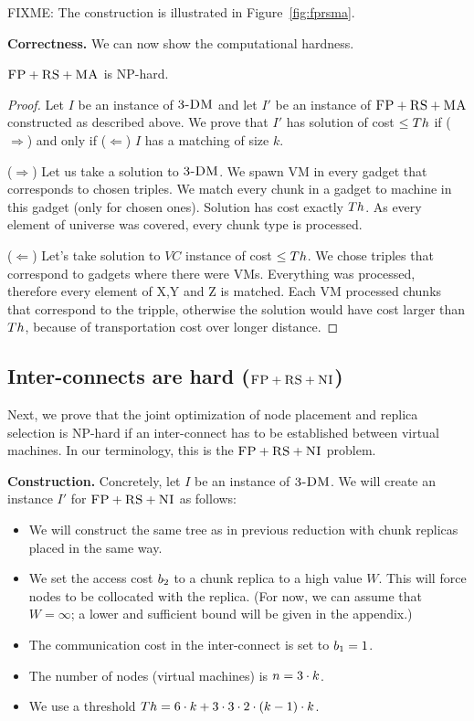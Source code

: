 FIXME: The construction is illustrated in Figure~\ref{fig:fprsma}.

\textbf{Correctness.}
We can now show the computational hardness.
\begin{theorem}
$\textsc{FP}+\textsc{RS}+\textsc{MA}$ is NP-hard.
\end{theorem}
\begin{proof}
Let $I$ be an instance of $\textsc{3-DM}$ and let $I'$ be an instance of
$\textsc{FP}+\textsc{RS}+\textsc{MA}$ constructed as described above.
We prove that $I'$ has solution of cost $\leq Th$ if ($\Rightarrow$) and only if
($\Leftarrow$)
$I$ has a matching of size $k$.

($\Rightarrow$) Let us take a solution to $\textsc{3-DM}$. We spawn VM in every
gadget that corresponds to chosen triples. We match every chunk in a
gadget to machine in this gadget (only for chosen ones). Solution has
cost exactly $Th$. As every element of universe was covered, every
chunk type is processed.

($\Leftarrow$) Let's take solution to $VC$ instance of cost $\leq Th$. We
chose triples that correspond to gadgets where there were VMs. Everything
was processed, therefore every element of X,Y and Z is matched. Each
VM processed chunks that correspond to the tripple, otherwise the
solution would have cost larger than $Th$, because of 
transportation cost over longer distance.
\end{proof}


\subsection{Inter-connects are hard ($\textsc{FP}+\textsc{RS}+\textsc{NI}$)}\label{ssec:fprscc}


Next, we prove that the joint optimization of node placement and replica selection
is NP-hard if an inter-connect has to be established between virtual machines.
In our terminology, this is the $\textsc{FP}+\textsc{RS}+\textsc{NI}$ problem.

\textbf{Construction.}
Concretely, let $I$ be an instance of $\textsc{3-DM}$. We will create an instance $I'$
for $\textsc{FP}+\textsc{RS}+\textsc{NI}$ as follows:
\begin{itemize}
\item We will construct the same tree as in previous reduction with
chunk replicas placed in the same way.
\item We set the access cost $b_2$ to a chunk replica to a high value $W$. This will force
nodes to be collocated with the replica.
(For now, we can assume that $W=\infty$; a lower and sufficient bound will be given
in the appendix.)
\item The communication cost in the inter-connect is set to $b_1 = 1$.
\item The number of nodes (virtual machines) is $n = 3 \cdot k$.
\item We use a threshold $Th =  6 \cdot k + 3 \cdot 3 \cdot 2 \cdot
(k - 1) \cdot k$.
\end{itemize}


